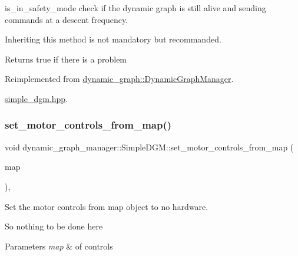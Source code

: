 is\+\_\+in\+\_\+safety\+\_\+mode check if the dynamic graph is still alive and sending commands at a descent frequency. 

Inheriting this method is not mandatory but recommanded. \begin{DoxyReturn}{Returns}
true if there is a problem 
\end{DoxyReturn}


Reimplemented from \hyperlink{classdynamic__graph_1_1DynamicGraphManager_aea29e8dc351e0a50a8d2803d854d238d}{dynamic\+\_\+graph\+::\+Dynamic\+Graph\+Manager}.

\begin{Desc}
\item[Examples\+: ]\par
\hyperlink{simple_dgm_8hpp-example}{simple\+\_\+dgm.\+hpp}.\end{Desc}
\mbox{\label{classdynamic__graph__manager_1_1SimpleDGM_ad38ccd35cc0c409a0aaefa8565634109}} 
\subsubsection{\texorpdfstring{set\+\_\+motor\+\_\+controls\+\_\+from\+\_\+map()}{set\_motor\_controls\_from\_map()}}
{\footnotesize\ttfamily void dynamic\+\_\+graph\+\_\+manager\+::\+Simple\+D\+G\+M\+::set\+\_\+motor\+\_\+controls\+\_\+from\+\_\+map (\begin{DoxyParamCaption}\item[{const \hyperlink{namespacedynamic__graph_abd184187f3bc15df5e227d866529e4a7}{dynamic\+\_\+graph\+::\+Vector\+D\+G\+Map} \&}]{map }\end{DoxyParamCaption})\hspace{0.3cm}{\ttfamily [inline]}, {\ttfamily [virtual]}}



Set the motor controls from map object to no hardware. 

So nothing to be done here


\begin{DoxyParams}{Parameters}
{\em map} & of controls \\
\hline
\end{DoxyParams}


